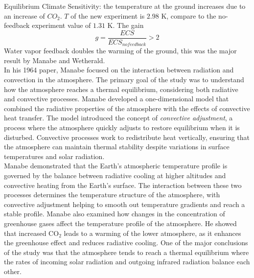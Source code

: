 Equilibrium Climate Sensitivity: the temperature at the
ground increases due to an increase of $CO_2$. $T$ of the new experiment is $2.98$ K, compare to the no-feedback experiment value of $1.31$ K. The gain
$$g=\frac{ECS}{ECS_{nofeedback}}>2$$
Water vapor feedback doubles the warming of the ground, this was the major result by Manabe and
Wetherald.\\
[0.4 cm]

In his 1964 paper, Manabe\cite{Manabe1964} focused on the interaction between radiation and convection in the atmosphere. The primary goal of the study was to understand how the atmosphere reaches a thermal equilibrium, considering both radiative and convective processes. Manabe developed a one-dimensional model that combined the radiative properties of the atmosphere with the effects of convective heat transfer. The model introduced the concept of \textit{convective adjustment}, a process where the atmosphere quickly adjusts to restore equilibrium when it is disturbed. Convective processes work to redistribute heat vertically, ensuring that the atmosphere can maintain thermal stability despite variations in surface temperatures and solar radiation. \\

Manabe demonstrated that the Earth's atmospheric temperature profile is governed by the balance between radiative cooling at higher altitudes and convective heating from the Earth's surface. The interaction between these two processes determines the temperature structure of the atmosphere, with convective adjustment helping to smooth out temperature gradients and reach a stable profile. Manabe also examined how changes in the concentration of greenhouse gases affect the temperature profile of the atmosphere. He showed that increased CO$_2$ leads to a warming of the lower atmosphere, as it enhances the greenhouse effect and reduces radiative cooling. One of the major conclusions of the study was that the atmosphere tends to reach a thermal equilibrium where the rates of incoming solar radiation and outgoing infrared radiation balance each other.




